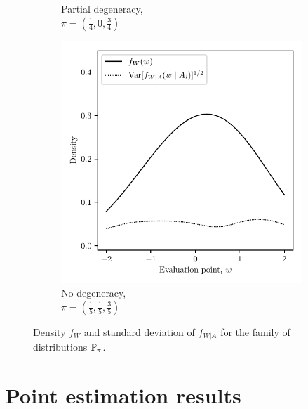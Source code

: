 \begin{figure}[ht]
\begin{subfigure}{0.32\textwidth}
    \caption{
      Partial degeneracy, \\
      $\pi = \left( \frac{1}{4}, 0, \frac{3}{4} \right)$
    }
  \end{subfigure}
  \begin{subfigure}{0.32\textwidth}
    \centering
    \includegraphics[scale=0.48]{graphics/illustration_none.pdf}
    \caption{
      No degeneracy, \\
      $\pi = \left( \frac{1}{5}, \frac{1}{5}, \frac{3}{5} \right)$
    }
  \end{subfigure}
  \caption{
    Density $f_W$ and standard deviation
    of $f_{W|A}$ for the family of distributions $\P_\pi$.\\
  }
  \label{fig:distribution}
\end{figure}

\section{Point estimation results}\label{sec:point_estimation}

